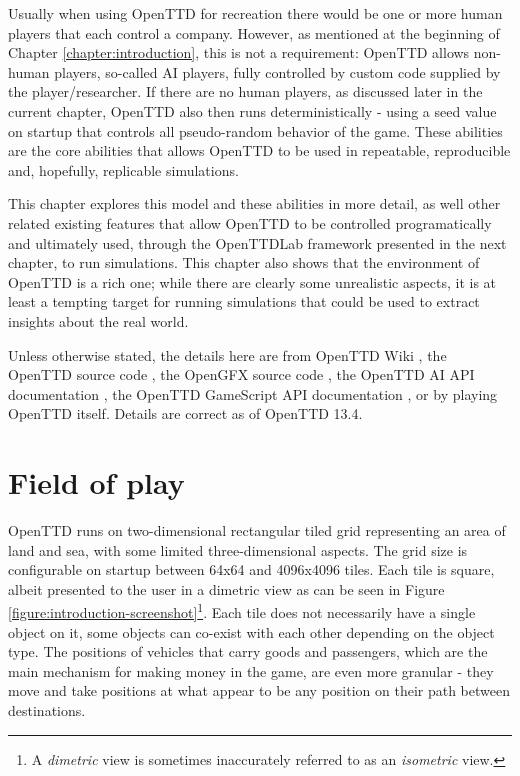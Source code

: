 \documentclass[logo,msc,dsti]{style/infthesis}    %
\begin{document}
{Usually when using OpenTTD for recreation there would be one or more human players that each control a company. However, as mentioned at the beginning of Chapter \ref{chapter:introduction}, this is not a requirement: OpenTTD allows non-human players, so-called AI players, fully controlled by custom code supplied by the player/researcher. If there are no human players, as discussed later in the current chapter, OpenTTD also then runs deterministically - using a seed value on startup that controls all pseudo-random behavior of the game. These abilities are the core abilities that allows OpenTTD to be used in repeatable, reproducible and, hopefully, replicable simulations.

This chapter explores this model and these abilities in more detail, as well other related existing features that allow OpenTTD to be controlled programatically and ultimately used, through the OpenTTDLab framework presented in the next chapter, to run simulations. This chapter also shows that the environment of OpenTTD is a rich one; while there are clearly some unrealistic aspects, it is at least a tempting target for running simulations that could be used to extract  insights about the real world.

Unless otherwise stated, the details here are from OpenTTD Wiki \cite{OpenTTDWiki}, the OpenTTD source code \cite{OpenTTDSource}, the OpenGFX source code \cite{OpenGFXSource}, the OpenTTD AI API documentation \cite{OpenTTDAIAPIDocs}, the OpenTTD GameScript API documentation \cite{OpenTTDGSAPIDocs}, or by playing OpenTTD itself. Details are correct as of OpenTTD 13.4.

\section{Field of play}

OpenTTD runs on two-dimensional rectangular tiled grid representing an area of land and sea, with some limited three-dimensional aspects. The grid size is configurable on startup between 64x64 and 4096x4096 tiles. Each tile is square, albeit presented to the user in a dimetric view as can be seen in Figure \ref{figure:introduction-screenshot}\footnote{A \emph{dimetric} view is sometimes inaccurately referred to as an \emph{isometric} view.}. Each tile does not necessarily have a single object on it, some objects can co-exist with each other depending on the object type. The positions of vehicles that carry goods and passengers, which are the main mechanism for making money in the game, are even more granular - they move and take positions at what appear to be any position on their path between destinations.

}
\end{document}
